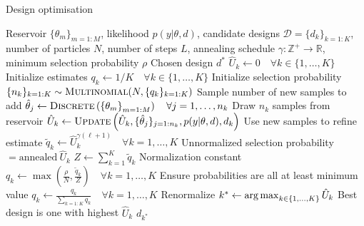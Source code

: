 \begin{algorithm}[t]
	\small
	\captionsetup{labelfont=bf, justification=justified,singlelinecheck=false}
	\caption{Design optimisation \label{alg:des-opt}}
	\begin{algorithmic}[1]
		\renewcommand{\algorithmicrequire}{\textbf{Inputs:}}
		\renewcommand{\algorithmicensure}{\textbf{Outputs:}}				 
		\Require Reservoir $\{\theta_m\}_{m=1:M}$, likelihood $p(y | \theta, d)$,
		candidate designs $\mathcal{D} = \{d_k\}_{k=1:K}$, number of particles $N$, number of steps
		$L$, annealing schedule $\gamma : \mathbb{Z}^+ \rightarrow \mathbb{R}$, minimum selection probability $\rho$
		\Ensure Chosen design $d^*$
		\State $\hat{U}_k \leftarrow 0 \quad \forall k \in \{1,\dots,K\}$ \Comment Initialize estimates
		\State $q_k \leftarrow 1/K \quad \forall k \in \{1,\dots,K\}$ \Comment Initialize selection probability
		\State $\{n_k\}_{k=1:K} \sim \textsc{Multinomial}(N,\{q_k\}_{k=1:K})$ \label{line:des-opt:sample-nsamples}
		\Comment Sample number of new samples to add\footnotemark
		\State $\hat{\theta}_{j} \leftarrow \textsc{Discrete}\left(\left\{\theta_m\right\}_{m=1:M}\right) \quad \forall j=1,\dots,n_k$ \label{line:des-opt:draw-theta}
		\Comment Draw $n_k$ samples from reservoir
		\State $\hat{U}_k \leftarrow \textsc{Update}\left(\hat{U}_k,\{\hat{\theta}_j\}_{j=1:n_k},p(y | \theta, d),d_k\right)$
		\label{line:des-opt:refine-U}
		\Comment Use new samples to refine estimate %
		\EndFor	
		\State $\tilde{q}_k \leftarrow \hat{U}_k^{\gamma(\ell+1)} \quad \forall k = 1,\dots,K$ 
		\label{line:des-opt:set-p}
		\Comment Unnormalized selection probability $= \text{annealed} ~\hat{U}_k$
		\State $Z \leftarrow \sum_{k=1}^{K} \tilde{q}_k $ \Comment Normalization constant
		\State $q_k \leftarrow \max\left(\frac{\rho}{N},\frac{\tilde{q}_k }{Z}\right) \quad \forall k = 1,\dots,K$ \Comment Ensure probabilities are all at least minimum value
		\State $q_k \leftarrow \frac{q_k}{\sum_{k=1:K} q_k} \quad \forall k = 1,\dots,K$ 
		\label{line:des-opt:renorm}
		\Comment Renormalize
		\EndFor	
		\State $k^* \leftarrow \operatorname*{arg\,max}_{k \in \{1,\dots,K\}} \hat{U}_k$ \Comment Best design is one with highest $\hat{U}_k$
		\State \Return $d_{k^*}$
	\end{algorithmic}
\end{algorithm}

